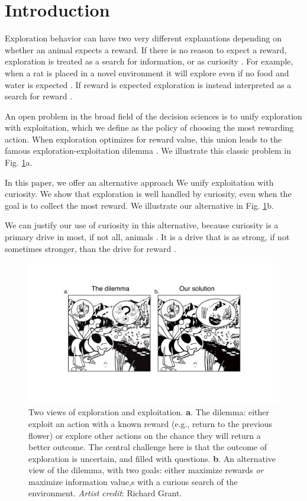\section*{Introduction}
Exploration behavior can have two very different explanations depending on whether an animal expects a reward. If there is no reason to expect a reward, exploration is treated as a search for information, or as curiosity \cite{Berlyne1950,Schmidhuber1991,Kidd2015,Jaegle2019,Sumner2019,Wang2019,Auersperg2015}. For example, when a rat is placed in a novel environment it will explore even if no food and water is expected \cite{Berlyne1950,Rosenberg2021}. If reward is expected exploration is instead interpreted as a search for reward \cite{Gupta2006,Sutton2018,Woodgate2017,Lee2011a,Schulz2018a,Calhoun2014}. 

An open problem in the broad field of the decision sciences is to unify exploration with exploitation, which we define as the policy of choosing the most rewarding action. When exploration optimizes for reward value, this union leads to the famous exploration-exploitation dilemma \cite{Kelly1956,Berger-Tal2014,Dayan1996,Thrun1992,Mehlhorn2015,Kobayashi2019}. We illustrate this classic problem in Fig. \ref{fig:bee}a.

In this paper, we offer an alternative approach We unify exploitation with curiosity. We show that exploration is well handled by curiosity, even when the goal is to collect the most reward. We illustrate our alternative in Fig. \ref{fig:bee}b. 

We can justify our use of curiosity in this alternative, because curiosity is a primary drive in most, if not all, animals \cite{Berlyne1950,Loewenstein1994,Inglis2001}. It is a drive that is as strong, if not sometimes stronger, than the drive for reward \cite{Loewenstein1994,Kidd2015,Gottlieb2018,Sumner2019,Gopnik2020,Song2019,Wang2019}. 

\begin{figure}
	\includegraphics[width=.9\linewidth]{img/bee.pdf} 
	\caption{Two views of exploration and exploitation. \textbf{a}. The dilemma: either exploit an action with a known reward (e.g., return to the previous flower) or explore other actions on the chance they will return a better outcome. The central challenge here is that the outcome of exploration is uncertain, and filled with questions. \textbf{b}. An alternative view of the dilemma, with two goals: either maximize rewards \textit{or} maximize information value,s with a curious search of the environment. \textit{Artist credit}: Richard Grant.}
	\label{fig:bee} 
\end{figure}

